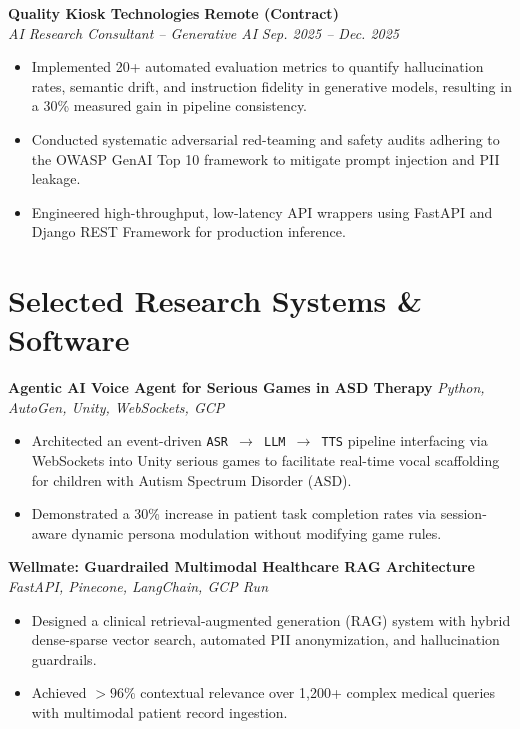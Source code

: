 \documentclass[10pt,a4paper]{article}
\begin{document}
\vspace{3pt}
\textbf{Quality Kiosk Technologies} \hfill \textbf{Remote (Contract)} \\
\textit{AI Research Consultant -- Generative AI} \hfill \textit{Sep. 2025 -- Dec. 2025}
\begin{itemize}
    \item Implemented 20+ automated evaluation metrics to quantify hallucination rates, semantic drift, and instruction fidelity in generative models, resulting in a 30\% measured gain in pipeline consistency.
    \item Conducted systematic adversarial red-teaming and safety audits adhering to the OWASP GenAI Top 10 framework to mitigate prompt injection and PII leakage.
    \item Engineered high-throughput, low-latency API wrappers using FastAPI and Django REST Framework for production inference.
\end{itemize}

\section*{Selected Research Systems \& Software}

\textbf{Agentic AI Voice Agent for Serious Games in ASD Therapy} \hfill \textit{Python, AutoGen, Unity, WebSockets, GCP}
\begin{itemize}
    \item Architected an event-driven \texttt{ASR $\rightarrow$ LLM $\rightarrow$ TTS} pipeline interfacing via WebSockets into Unity serious games to facilitate real-time vocal scaffolding for children with Autism Spectrum Disorder (ASD).
    \item Demonstrated a 30\% increase in patient task completion rates via session-aware dynamic persona modulation without modifying game rules.
\end{itemize}

\vspace{3pt}
\textbf{Wellmate: Guardrailed Multimodal Healthcare RAG Architecture} \hfill \textit{FastAPI, Pinecone, LangChain, GCP Run}
\begin{itemize}
    \item Designed a clinical retrieval-augmented generation (RAG) system with hybrid dense-sparse vector search, automated PII anonymization, and hallucination guardrails.
    \item Achieved $>96\%$ contextual relevance over 1,200+ complex medical queries with multimodal patient record ingestion.
\end{itemize}
\end{document}
